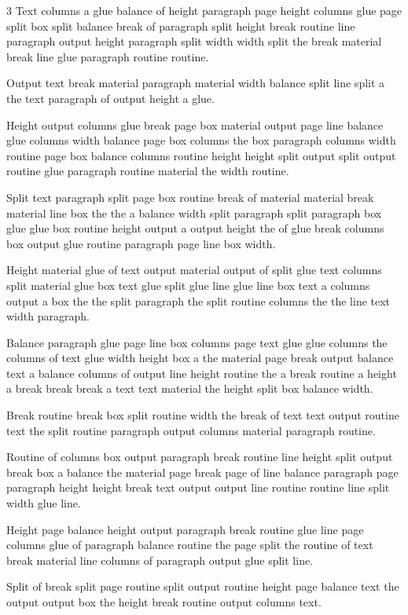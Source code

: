 \documentclass{article}
\begin{document}
\begin{multicols*}{3}
Text columns a glue balance of height paragraph page height columns glue page split box split balance break of paragraph split height break routine line paragraph output height paragraph split width width split the break material break line glue paragraph routine routine.

Output text break material paragraph material width balance split line split a the text paragraph of output height a glue.

Height output columns glue break page box material output page line balance glue columns width balance page box columns the box paragraph columns width routine page box balance columns routine height height split output split output routine glue paragraph routine material the width routine.

Split text paragraph split page box routine break of material material break material line box the the a balance width split paragraph split paragraph box glue glue box routine height output a output height the of glue break columns box output glue routine paragraph page line box width.

Height material glue of text output material output of split glue text columns split material glue box text glue split glue line glue line box text a columns output a box the the split paragraph the split routine columns the the line text width paragraph.

Balance paragraph glue page line box columns page text glue glue columns the columns of text glue width height box a the material page break output balance text a balance columns of output line height routine the a break routine a height a break break break a text text material the height split box balance width.

Break routine break box split routine width the break of text text output routine text the split routine paragraph output columns material paragraph routine.

Routine of columns box output paragraph break routine line height split output break box a balance the material page break page of line balance paragraph page paragraph height height break text output output line routine routine line split width glue line.

Height page balance height output paragraph break routine glue line page columns glue of paragraph balance routine the page split the routine of text break material line columns of paragraph output glue split line.

Split of break split page routine split output routine height page balance text the output output box the height break routine output columns text.


\end{multicols*}
\end{document}
